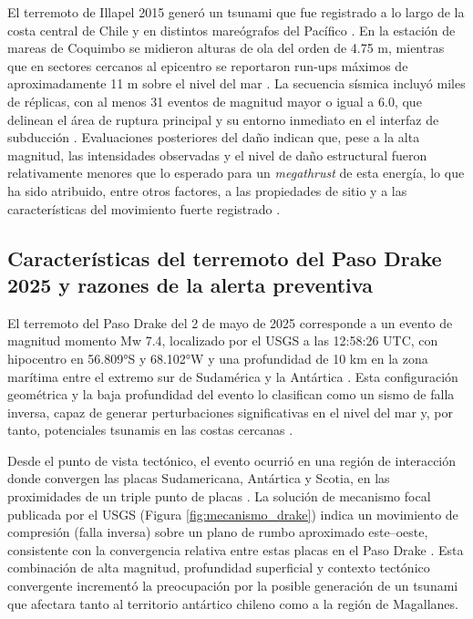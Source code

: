 \documentclass[a4paper,12pt]{article} %
\numberwithin{equation}{section} %
\numberwithin{figure}{section} %
\begin{document}
El terremoto de Illapel 2015 generó un tsunami que fue registrado a lo largo de la costa central de Chile y en distintos mareógrafos del Pacífico \cite{IRIS_SpecialEvent_Illapel2015,ITIC_Tsunami_Illapel2015,Aranguiz_Geotech_Illapel2015}. En la estación de mareas de Coquimbo se midieron alturas de ola del orden de 4.75 m, mientras que en sectores cercanos al epicentro se reportaron run-ups máximos de aproximadamente 11 m sobre el nivel del mar \cite{Aranguiz_Geotech_Illapel2015,ITIC_Tsunami_Illapel2015}. La secuencia sísmica incluyó miles de réplicas, con al menos 31 eventos de magnitud mayor o igual a 6.0, que delinean el área de ruptura principal y su entorno inmediato en el interfaz de subducción \cite{Wikipedia_Illapel2015,Ruiz_SeismicSequence_Illapel2016}. Evaluaciones posteriores del daño indican que, pese a la alta magnitud, las intensidades observadas y el nivel de daño estructural fueron relativamente menores que lo esperado para un \emph{megathrust} de esta energía, lo que ha sido atribuido, entre otros factores, a las propiedades de sitio y a las características del movimiento fuerte registrado \cite{Fernandez_Damage_Illapel2018}.


\subsection{Características del terremoto del Paso Drake 2025 y razones de la alerta preventiva}

El terremoto del Paso Drake del 2 de mayo de 2025 corresponde a un evento de magnitud momento Mw 7.4, localizado por el USGS a las 12:58:26 UTC, con hipocentro en 56.809°S y 68.102°W y una profundidad de 10 km en la zona marítima entre el extremo sur de Sudamérica y la Antártica \cite{USGS_Drake2025,Wikipedia_Drake2025}. Esta configuración geométrica y la baja profundidad del evento lo clasifican como un sismo de falla inversa, capaz de generar perturbaciones significativas en el nivel del mar y, por tanto, potenciales tsunamis en las costas cercanas \cite{USGS_Drake2025}.

Desde el punto de vista tectónico, el evento ocurrió en una región de interacción donde convergen las placas Sudamericana, Antártica y Scotia, en las proximidades de un triple punto de placas \cite{USGS_Drake2025,Wikipedia_Drake2025}. La solución de mecanismo focal publicada por el USGS (Figura \ref{fig:mecanismo_drake}) indica un movimiento de compresión (falla inversa) sobre un plano de rumbo aproximado este--oeste, consistente con la convergencia relativa entre estas placas en el Paso Drake \cite{USGS_Drake2025,Wikipedia_Drake2025}. Esta combinación de alta magnitud, profundidad superficial y contexto tectónico convergente incrementó la preocupación por la posible generación de un tsunami que afectara tanto al territorio antártico chileno como a la región de Magallanes.
\end{document}
